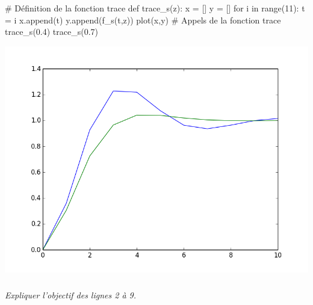 \documentclass[10pt]{article}
\newif\ifprof
\begin{document}
\begin{minipage}[c]{.48\linewidth}
\begin{py}
\begin{python}
# Définition de la fonction trace
def trace_s(z):
    x = []
    y = []
    for i in range(11):
        t = i
        x.append(t)
        y.append(f_s(t,z))
    plot(x,y)
# Appels de la fonction trace
trace_s(0.4)
trace_s(0.7)

\end{python}
\end{py}
\end{minipage} \hfill
\begin{minipage}[c]{.48\linewidth}
\begin{center}
\includegraphics[width=\textwidth]{images/courbe}
\end{center}
\end{minipage}

\subparagraph{}
\textit{Expliquer l'objectif des lignes 2 à 9.}
\ifprof
\begin{corrige}
\begin{itemize}
\item La ligne 2 permet de définir la fonction.
\item Les lignes 3 et 4 permettent d'initialiser deux listes.
\item Les lignes 5 à 8 vont permettre de créer deux listes de 11 éléments. Ainsi la liste x contiendra le temps réduit de 0 à 10 et la liste y contiendra les valeurs de s(x) pour chacune de ces 11 valeurs. 
\end{itemize}
\end{corrige}
\else
\vspace{.25cm}
\fi
\end{document}
